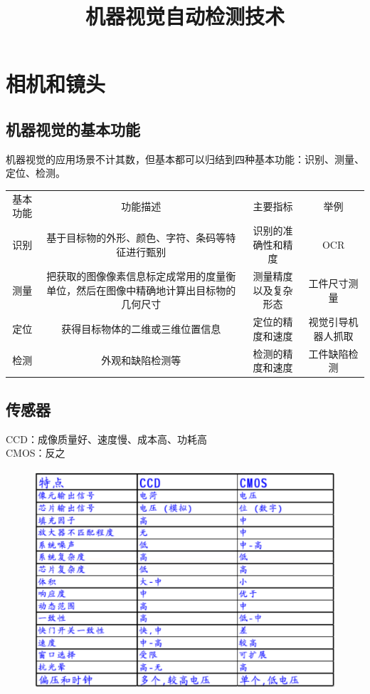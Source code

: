 \documentclass[11pt]{article}
\title{机器视觉自动检测技术}
\begin{document}
\maketitle

\section{相机和镜头}

\subsection{机器视觉的基本功能}
机器视觉的应用场景不计其数，但基本都可以归结到四种基本功能：识别、测量、定位、检测。 \\
\begin{tabular}{c c c c}
    基本功能 & 功能描述 & 主要指标 & 举例\\
    识别 & 基于目标物的外形、颜色、字符、条码等特征进行甄别 & 识别的准确性和精度 & OCR \\
    测量 & 把获取的图像像素信息标定成常用的度量衡单位，然后在图像中精确地计算出目标物的几何尺寸 & 测量精度以及复杂形态 & 工件尺寸测量 \\
    定位 & 获得目标物体的二维或三维位置信息 & 定位的精度和速度 & 视觉引导机器人抓取 \\
    检测 & 外观和缺陷检测等 & 检测的精度和速度 & 工件缺陷检测 \\
\end{tabular}

\subsection{传感器}
CCD：成像质量好、速度慢、成本高、功耗高  \\
CMOS：反之
\begin{figure}[htb]
    \centering
    \includegraphics[scale=0.1]{imgs/CCD_CMOS.png}
\end{figure}
\end{document}
